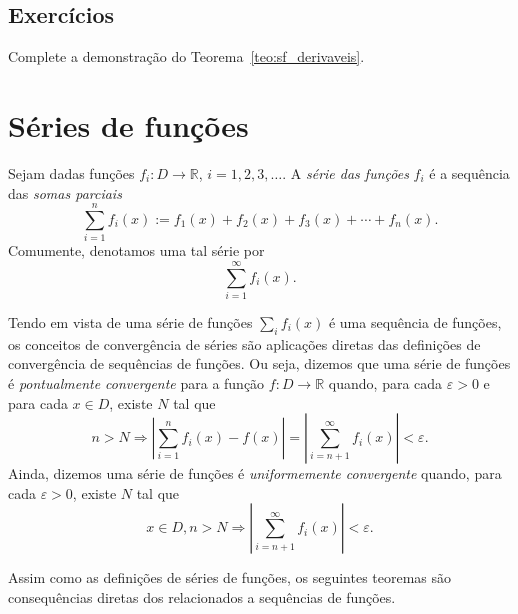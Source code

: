 \subsection*{Exercícios}

\begin{exer}
  Complete a demonstração do Teorema~\ref{teo:sf_derivaveis}.
\end{exer}

\section{Séries de funções}\label{c_ssf_s_serf}

\begin{defn}
  Sejam dadas funções $f_i:D\to\mathbb{R}$, $i=1, 2, 3, \ldots$. A \emph{série das funções} $f_i$ é a sequência das \emph{somas parciais}
  \begin{equation}
    \sum_{i=1}^n f_i(x) := f_1(x) + f_2(x) + f_3(x) + \cdots + f_n(x).
  \end{equation}
Comumente, denotamos uma tal série por
\begin{equation}
  \sum_{i=1}^\infty f_i(x).
\end{equation}
\end{defn}

Tendo em vista de uma série de funções $\sum_i f_i(x)$ é uma sequência de funções, os conceitos de convergência de séries são aplicações diretas das definições de convergência de sequências de funções. Ou seja, dizemos que uma série de funções é \emph{pontualmente convergente} para a função $f:D\to\mathbb{R}$ quando, para cada $\varepsilon>0$ e para cada $x\in D$, existe $N$ tal que
\begin{equation}
  n>N \Rightarrow \left|\sum_{i=1}^n f_i(x) - f(x)\right| = \left|\sum_{i=n+1}^\infty f_i(x)\right| < \varepsilon.
\end{equation}
Ainda, dizemos uma série de funções é \emph{uniformemente convergente} quando, para cada $\varepsilon>0$, existe $N$ tal que
\begin{equation}
  x\in D, n>N \Rightarrow \left|\sum_{i=n+1}^\infty f_i(x)\right| <  \varepsilon.
\end{equation}

Assim como as definições de séries de funções, os seguintes teoremas são consequências diretas dos relacionados a sequências de funções.

